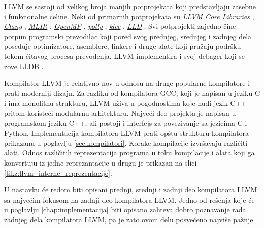 \documentclass[12pt,oneside]{memoir}
\begin{document}
LLVM se sastoji od velikog broja manjih potprojekata 
koji predstavljaju zasebne i funkcionalne celine. Neki od primarnih potprojekata su 
\href{https://llvm.org/docs/doxygen/group__LLVMCCore.html}{\textit{LLVM Core Libraries}} \cite{llvm_core}, 
\href{https://clang.llvm.org/}{\textit{Clang}} \cite{clang}, 
\href{https://mlir.llvm.org/}{\textit{MLIR}} \cite{mlir}, 
\href{https://openmp.llvm.org/}{\textit{OpenMP}} \cite{openmp}, 
\href{https://polly.llvm.org/}{\textit{polly}} \cite{polly}, 
\href{https://klee-se.org/}{\textit{klee}} \cite{klee}, 
\href{https://lld.llvm.org/}{\textit{LLD}} \cite{llvm_lld}. Svi potprojekti zajedno čine potpun programski prevodilac koji pored 
svog prednjeg, srednjeg i zadnjeg dela poseduje optimizatore, asemblere, linkere i druge alate 
koji pružaju podršku tokom čitavog procesa prevođenja. LLVM implementira i svoj debager koji se 
zove LLDB \cite{lldb}.

Kompilator LLVM je relativno nov u odnosu na druge popularne kompilatore
i prati moderniji dizajn. Za razliku od kompilatora GCC, koji je napisan u
jeziku C i ima monolitnu strukturu, LLVM uživa u pogodnostima koje nudi jezik
C++ pritom koristeći modularnu arhitekturu. Najveći deo projekta je napisan u programskom jeziku C++, ali postoji i interfejs za povezivanje sa jezicima C i Python.
Implementacija kompilatora LLVM prati opštu strukturu kompilatora prikazanu
u poglavlju \ref{sec:kompilatori}. Korake kompilacije izvršavaju različiti alati. Odnos različitih
reprezentacija programa u toku kompilacije i alata koji ga konvertuju iz jedne
reprezantacije u drugu je prikazan na slici \ref{tikz:llvm_interne_reprezentacije}. 
 
U nastavku će redom biti opisani prednji, srednji i zadnji deo kompilatora LLVM sa najvećim fokusom na zadnji deo kompilatora LLVM. Jedno od rešenja koje će u poglavlju \ref{chap:implementacija} biti opisano zahteva dobro poznavanje rada zadnjeg dela kompilatora LLVM, pa je zato ovom delu posvećeno najviše pažnje.

\end{document}
